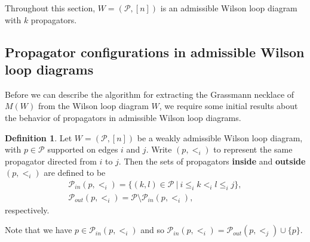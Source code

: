\documentclass[11pt]{article}
\newcommand{\note}{\todo[color=green!40]}
\newcommand{\cP}{\mathcal{P}}
\theoremstyle{remark}
\theoremstyle{definition}
\newtheorem{dfn}[thm]{Definition}
\begin{document}


Throughout this section, $W = (\cP,[n])$ is an admissible Wilson loop diagram with $k$ propagators.





\subsection{Propagator configurations in admissible Wilson loop diagrams}\label{sec:propagator configs}

Before we can describe the algorithm for extracting the Grassmann necklace of $M(W)$ from the Wilson loop diagram $W$, we require some initial results about the behavior of propagators in admissible Wilson loop diagrams.



\begin{dfn}\label{props inside p}
Let $W = (\cP, [n])$ be a weakly admissible Wilson loop diagram, with $p \in \cP$ supported on edges $i$ and $j$. Write $(p, <_i)$ to represent the same propagator directed from $i$ to $j$. Then the sets of propagators {\bf inside} and {\bf outside}  $(p,<_i)$ are defined to be
\begin{gather*}\cP_{in}(p,<_i) = \{ (k,l) \in \cP \ |\ i \leq_i k <_i l \leq_i j \}, \\
\cP_{out}(p,<_i) = \cP\setminus \cP_{in}(p,<_i),
\end{gather*}
respectively.
\end{dfn}
Note that we have $p\in \cP_{in}(p, <_i)$ and so $\cP_{in}(p, <_i) = \cP_{out}(p, <_j)\cup\{p\}$.
\end{document}
